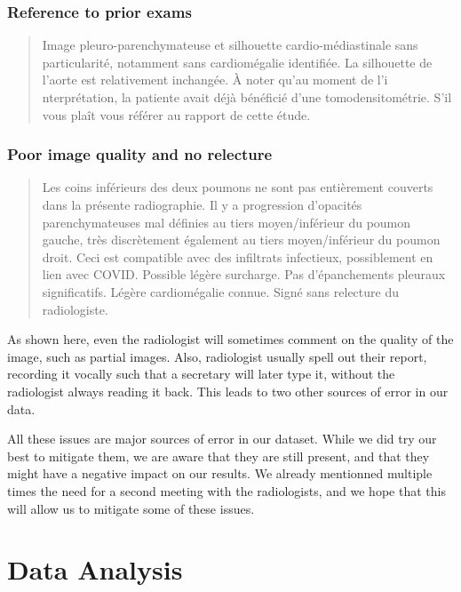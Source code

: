 \documentclass[11pt]{article}
\begin{document}
     \subsubsection{Reference to prior exams}
            \begin{quote}
                Image pleuro-parenchymateuse et silhouette cardio-médiastinale sans particularité, notamment sans cardiomégalie identifiée. La silhouette de l'aorte est relativement inchangée.
À noter qu'au moment de l'i nterprétation, la patiente avait déjà bénéficié d'une tomodensitométrie. S'il vous plaît vous référer au rapport de cette étude.
           \end{quote}


    \subsubsection{Poor image quality and no relecture}
       \begin{quote}
            Les coins inférieurs des deux poumons ne sont pas entièrement couverts dans la présente radiographie.
            Il y a progression d'opacités parenchymateuses mal définies au tiers moyen/inférieur du poumon gauche, très discrètement également au tiers moyen/inférieur du poumon droit. Ceci est compatible avec des infiltrats infectieux, possiblement en lien avec COVID. Possible légère surcharge. Pas d'épanchements pleuraux significatifs. Légère cardiomégalie connue.
            Signé sans relecture du radiologiste.
        \end{quote}

    As shown here, even the radiologist will sometimes comment on the quality of the image, such as partial images. Also, radiologist usually spell out their report, recording it vocally such that a secretary will later type it, without the radiologist
    always reading it back. This leads to two other sources of error in our data.

    All these issues are major sources of error in our dataset. While we did try our best to mitigate them, we are aware that they are still present, and that they might have a negative impact on our results. We already mentionned
    multiple times the need for a second meeting with the radiologists, and we hope that this will allow us to mitigate some of these issues.
    \section{Data Analysis}
\end{document}
